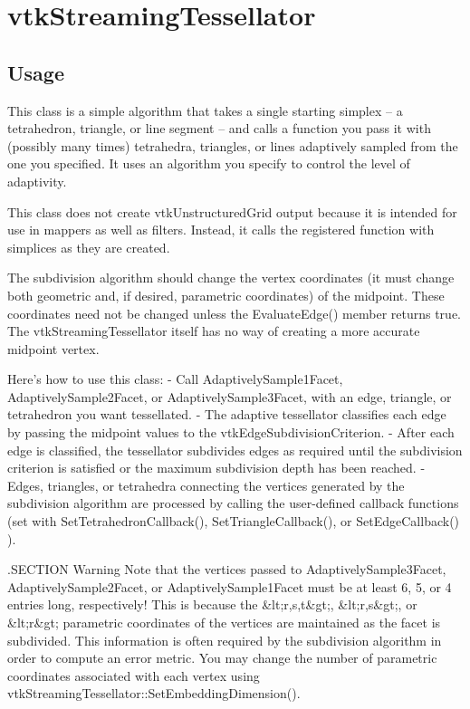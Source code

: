 \section{vtkStreamingTessellator}

\subsection{Usage}

 This class is a simple algorithm that takes a single starting simplex -- a
 tetrahedron, triangle, or line segment -- and calls a function you
 pass it with (possibly many times) tetrahedra, triangles, or lines
 adaptively sampled from the one you specified. It
 uses an algorithm you specify to control the level of adaptivity.

 This class does not create vtkUnstructuredGrid output because it is
 intended for use in mappers as well as filters. Instead, it
 calls the registered function with simplices as they are
 created.

 The subdivision algorithm should change the vertex
 coordinates (it must change both geometric and, if desired, parametric
 coordinates) of the midpoint. These coordinates need not be
 changed unless the EvaluateEdge() member returns true.
 The vtkStreamingTessellator itself has no way of creating
 a more accurate midpoint vertex.

 Here's how to use this class:
 - Call AdaptivelySample1Facet, AdaptivelySample2Facet, or
   AdaptivelySample3Facet, with an edge, triangle, or
   tetrahedron you want tessellated.
 - The adaptive tessellator classifies each edge by passing
   the midpoint values to the vtkEdgeSubdivisionCriterion.
 - After each edge is classified, the tessellator subdivides
   edges as required until the subdivision criterion is
   satisfied or the maximum subdivision depth has been
   reached.
 - Edges, triangles, or tetrahedra connecting the vertices
   generated by the subdivision algorithm are processed by
   calling the user-defined callback functions (set with 
   SetTetrahedronCallback(), SetTriangleCallback(),
   or SetEdgeCallback() ).

 .SECTION Warning
 Note that the vertices passed to AdaptivelySample3Facet, AdaptivelySample2Facet,
 or AdaptivelySample1Facet must be at least 6, 5, or 4 entries long, respectively!
 This is because the \&lt;r,s,t\&gt;, \&lt;r,s\&gt;, or \&lt;r\&gt;
 parametric coordinates of the vertices are maintained as the
 facet is subdivided. This information is often
 required by the subdivision algorithm in order to compute
 an error metric. You may change the number of parametric coordinates
 associated with each vertex using vtkStreamingTessellator::SetEmbeddingDimension().

